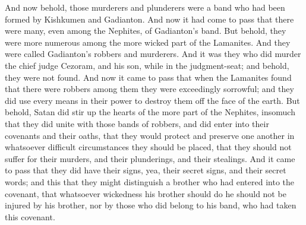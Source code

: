 And now behold, those murderers and plunderers were a band who had been formed by Kishkumen and Gadianton. And now it had come to pass that there were many, even among the Nephites, of Gadianton's band. But behold, they were more numerous among the more wicked part of the Lamanites. And they were called Gadianton's robbers and murderers.
\bverse \iffalse And it was they who did murder the chief judge Cezoram, and his son, while in the judgment-seat; and behold, they were not found. \fi
And it was they who did murder the chief judge Cezoram, and his son, while in the judgment-seat; and behold, they were not found.
\bverse \iffalse And now it came to pass that when the Lamanites found that there were robbers among them they were exceedingly sorrowful; and they did use every means in their power to destroy them off the face of the earth. \fi
And now it came to pass that when the Lamanites found that there were robbers among them they were exceedingly sorrowful; and they did use every means in their power to destroy them off the face of the earth.
\bverse \iffalse But behold, Satan did stir up the hearts of the more part of the Nephites, insomuch that they did unite with those bands of robbers, and did enter into their covenants and their oaths, that they would protect and preserve one another in whatsoever difficult circumstances they should be placed, that they should not suffer for their murders, and their plunderings, and their stealings. \fi
But behold, Satan did stir up the hearts of the more part of the Nephites, insomuch that they did unite with those bands of robbers, and did enter into their covenants and their oaths, that they would protect and preserve one another in whatsoever difficult circumstances they should be placed, that they should not suffer for their murders, and their plunderings, and their stealings.
\bverse \iffalse And it came to pass that they did have their signs, yea, their secret signs, and their secret words; and this that they might distinguish a brother who had entered into the covenant, that whatsoever wickedness his brother should do he should not be injured by his brother, nor by those who did belong to his band, who had taken this covenant. \fi
And it came to pass that they did have their signs, yea, their secret signs, and their secret words; and this that they might distinguish a brother who had entered into the covenant, that whatsoever wickedness his brother should do he should not be injured by his brother, nor by those who did belong to his band, who had taken this covenant.
